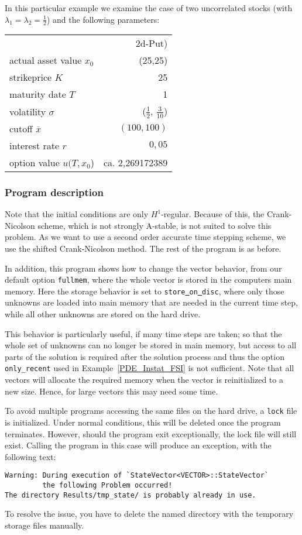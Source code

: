 In this particular example we examine the case of two uncorrelated stocks (with $\lambda_1=\lambda_2=\frac12$) and the following parameters:
 \begin{table}[hb]
    \centering
    \begin{tabular}{lr}
      \toprule 
 & 2d-Put)\\
       \cmidrule(l){2-2}
	 actual asset value $x_0$ 	&  (25,25)\\
	 strikeprice $K$			&  25 \\
	 maturity date $T$ 			& 1 \\
	 volatility $\sigma$		&  ($\frac12$, $\frac 3{10}$) \\
	 cutoff $\overline x$		& $(100,100)$\\
	 interest rate $r$ 				&  $0{,}05$\\
	 option value $u(T,x_0$)			& ca.  2{,}269172389 \\
      \bottomrule
    \end{tabular}
  \end{table}

\subsubsection{Program description}
Note that the initial conditions are only $H^1$-regular. Because of this, 
the Crank-Nicolson scheme, which is not strongly A-stable, is not suited to solve 
this problem. As we want to use a second order accurate time stepping scheme, we use 
the shifted Crank-Nicolson method. The rest of the program is as before.

In addition, this program shows how to change the vector behavior, from our
default option \texttt{fullmem}, where the whole vector
is stored in the computers main memory. Here the storage behavior is set to 
\texttt{store\underline{ }on\underline{ }disc}, where only those unknowns are loaded into 
main memory that are needed in the current time step, while all other 
unknowns are stored on the hard drive. 

This behavior is particularly useful, if many time steps are taken; so that the 
whole set of unknowns can no longer be stored in main memory, but access to all
parts of the solution is required after the solution process and thus the 
option \texttt{only_recent} used in Example~\ref{PDE_Instat_FSI} is not sufficient.
Note that all vectors 
will allocate the required memory when the vector is reinitialized to a new size.
Hence, for large vectors this may need some time.

To avoid multiple programs accessing the same files on the hard drive, a 
\texttt{lock} file is initialized. Under normal conditions, this will be deleted 
once the program terminates. However, should the program exit exceptionally, the 
lock file will still exist. Calling the program in this case will produce an 
exception, with the following text:
\begin{verbatim}
Warning: During execution of `StateVector<VECTOR>::StateVector` 
         the following Problem occurred!
The directory Results/tmp_state/ is probably already in use.
\end{verbatim}
To resolve the issue, you have to delete the named directory with the 
temporary storage files manually.
